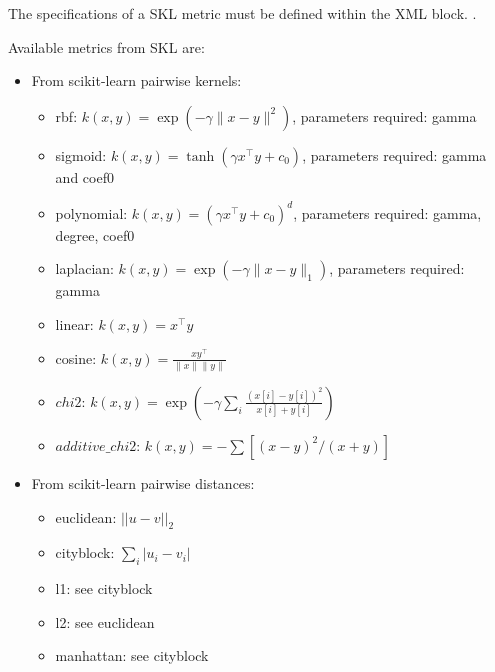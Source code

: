 The specifications of a SKL metric must be defined within the XML block.
.

Available metrics from SKL are:
\begin{itemize}  
  \item   From scikit-learn pairwise kernels:
    \begin{itemize}
       \item rbf: $k(x, y) = \exp( -\gamma \| x-y \|^2)$, parameters required: gamma  
       \item sigmoid: $k(x, y) = \tanh( \gamma x^\top y + c_0)$, parameters required: gamma and coef0 
       \item polynomial: $k(x, y) = (\gamma x^\top y +c_0)^d$, parameters required: gamma, degree, coef0
       \item laplacian: $k(x, y) = \exp( -\gamma \| x-y \|_1)$, parameters required: gamma 
       \item linear: $k(x, y) = x^\top y$ 
       \item cosine: $k(x, y) = \frac{x y^\top}{\|x\| \|y\|}$
       \item $chi2$: $k(x, y) = \exp \left (-\gamma \sum_i \frac{(x[i] - y[i]) ^ 2}{x[i] + y[i]} \right )$ 
       \item $additive\_chi2$: $k(x, y) = -\sum [(x - y)^2 / (x + y)]$
    \end{itemize}
  
  \item   From scikit-learn pairwise distances:
    \begin{itemize}
      \item euclidean: ${||u-v||}_2$
      \item cityblock: $\sum_i {\left| u_i - v_i \right|}$
      \item l1: see cityblock
      \item l2: see euclidean
      \item manhattan: see cityblock
     

\end{itemize}
\end{itemize}
